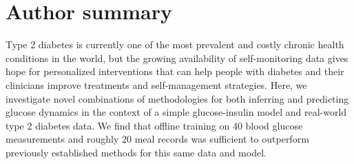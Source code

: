 \documentclass[10pt,letterpaper]{article}
\begin{document}
\section{Author summary}
Type 2 diabetes is currently one of the most prevalent and costly chronic health conditions in the world, but the growing availability of self-monitoring data gives hope for personalized interventions that can help people with diabetes and their clinicians improve treatments and self-management strategies. Here, we investigate novel combinations of methodologies for both inferring and predicting glucose dynamics in the context of a simple glucose-insulin model and real-world type 2 diabetes data. We find that offline training on 40 blood glucose measurements and roughly 20 meal records was sufficient to outperform previously established methods for this same data and model.








\end{document}
